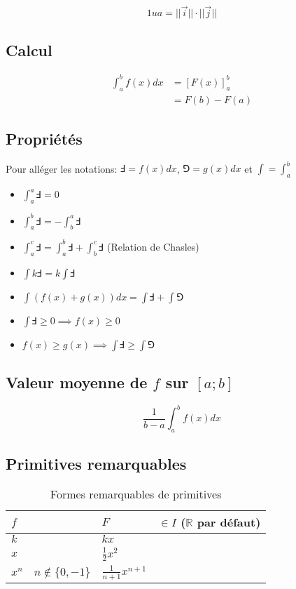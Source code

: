\documentclass{article}
\newcommand{\R}{\mathds{R}}
\begin{document}
$$
1 ua = ||\vec i||\cdot ||\vec j||
$$

\subsection{Calcul}

\begin{equation*}
    \begin{split}
        \int_a^b f(x) dx &= [F(x)]_a^b \\
                         &= F(b) - F(a)
    \end{split}
\end{equation*}

\subsection{Propriétés}

Pour alléger les notations: $\Finv = f(x)dx$, $\Game = g(x)dx$ et $\int = \int_a^b$

\begin{itemize}
    \item $\int_a^a \Finv = 0$
    \item $\int_a^b \Finv = -\int_b^a \Finv$
    \item $\int_a^c \Finv = \int_a^b \Finv + \int_b^c \Finv$   (Relation de Chasles)
    \item $\int k\Finv = k\int \Finv$
    \item $\int (f(x) + g(x))dx = \int \Finv + \int \Game$
    \item $\int \Finv \geq 0 \implies f(x) \geq 0$
    \item $f(x) \geq g(x) \implies \int \Finv \geq \int \Game$
\end{itemize}

\subsection{Valeur moyenne de $f$ sur $[a; b]$}

\[\frac{1}{b-a}\int_a^b f(x)dx\]

\subsection{Primitives remarquables}

\begin{table}[H]
    \centering
    \begin{tabular}{lll}
        $f$ & $F$ & $\in I$ ($\R$ par défaut) \\\hline
        $k$ & $kx$ & \\
        $x$ & $\frac{1}{2}x^2$ & \\
        $x^n\quad n\not\in\{0, -1\}$ & $\frac{1}{n+1}x^{n+1}$
    \end{tabular}
    \caption{Formes remarquables de primitives}
    \label{tab:primitives_remarquables}
\end{table}
\end{document}
